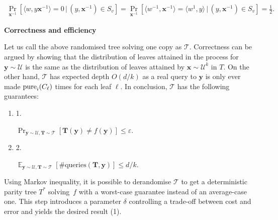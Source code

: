 \documentclass[10pt,a4paper]{article}
\begin{document}
\[\begin{gathered}
\Pr_{\bm{x}^{-1}}\left[\langle w,y\bm{x}^{-1}\rangle=0\,|\,(y,\bm{x}^{-1})\in S_{v}\right]=\Pr_{\bm{x}^{-1}}\left[\langle w^{-1},\bm{x}^{-1}\rangle=\langle w^{1},y\rangle\,|\,(y,\bm{x}^{-1})\in S_{v}\right]=\frac{1}{2}.
\end{gathered}\]





\par\medskip\noindent\textbf{Correctness and efficiency}\par




Let us call the above randomised tree solving one copy as $\mathcal{T}$. Correctness can be argued by showing that the distribution of leaves attained in the process for $\bm{y}\sim\mathcal{U}$ is the same as the distribution of leaves attained by $\bm{x}\sim\mathcal{U}^{k}$ in $T$. On the other hand, $\mathcal{T}$ has expected depth $O(d/k)$ as a real query to $\bm{y}$ is only ever made $\mathop{\textup{pure}}_{i}(C_{\ell})$ times for each leaf $\ell$. In conclusion, $\mathcal{T}$ has the following guarantees:\par


\begin{enumerate}


\item[] 
1. 


$\Pr_{\bm{y}\sim\mathcal{U},\bm{T}\sim\mathcal{T}}[\bm{T}(\bm{y})\neq f(\bm{y})]\leq\varepsilon$.\par





\item[] 
2. 


$\mathop{\mathbb{E}}_{\bm{y}\sim\mathcal{U},\bm{T}\sim\mathcal{T}}[\text{\#queries}(\bm{T},\bm{y})]\leq d/k$.\par





\end{enumerate}


Using Markov inequality, it is possible to derandomise $\mathcal{T}$ to get a deterministic parity tree $T^{*}$ solving $f$ with a worst-case guarantee instead of an average-case one. This step introduces a parameter $\delta$ controlling a trade-off between cost and error and yields the desired result (1).\par
\end{document}
